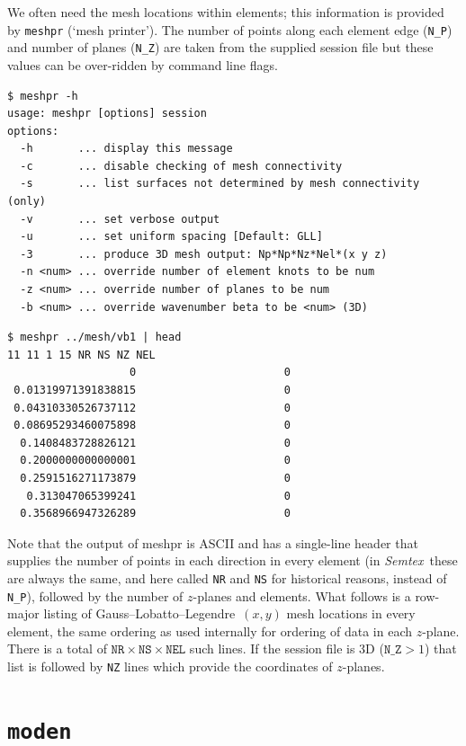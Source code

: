 \documentclass[11pt]{report}
\newcommand{\Semtex}{\emph{Semtex}} \newcommand{\Dog}{\emph{Dog}}
\newcommand\GLL{Gauss--Lobatto--Legendre}
\begin{document}
We often need the mesh locations within elements; this information is
provided by \verb|meshpr| (`mesh printer').  The number of points
along each element edge (\verb|N_P|) and number of planes (\verb|N_Z|)
are taken from the supplied session file but these values can be
over-ridden by command line flags.
%
{\small
\begin{verbatim}
$ meshpr -h
usage: meshpr [options] session
options:
  -h       ... display this message
  -c       ... disable checking of mesh connectivity
  -s       ... list surfaces not determined by mesh connectivity (only)
  -v       ... set verbose output
  -u       ... set uniform spacing [Default: GLL]
  -3       ... produce 3D mesh output: Np*Np*Nz*Nel*(x y z)
  -n <num> ... override number of element knots to be num
  -z <num> ... override number of planes to be num
  -b <num> ... override wavenumber beta to be <num> (3D)
\end{verbatim}
}
%
{\small
\begin{verbatim}
$ meshpr ../mesh/vb1 | head
11 11 1 15 NR NS NZ NEL
                   0                       0
 0.01319971391838815                       0
 0.04310330526737112                       0
 0.08695293460075898                       0
  0.1408483728826121                       0
  0.2000000000000001                       0
  0.2591516271173879                       0
   0.313047065399241                       0
  0.3568966947326289                       0
\end{verbatim}
}
%
Note that the output of meshpr is ASCII and has a single-line header
that supplies the number of points in each direction in every element
(in \Semtex\ these are always the same, and here called \verb|NR| and
\verb|NS| for historical reasons, instead of \verb|N_P|), followed by
the number of $z$-planes and elements.  What follows is a row-major
listing of \GLL\ $(x,y)$ mesh locations in every element, \ie the same
ordering as used internally for ordering of data in each $z$-plane.
There is a total of $\texttt{NR}\times\texttt{NS}\times\texttt{NEL}$
such lines.  If the session file is 3D (\ie $\texttt{N\_Z}>1$) that list
is followed by \texttt{NZ} lines which provide the coordinates of
$z$-planes.

\section{\texttt{moden}}
\label{sec.moden}
\end{document}
